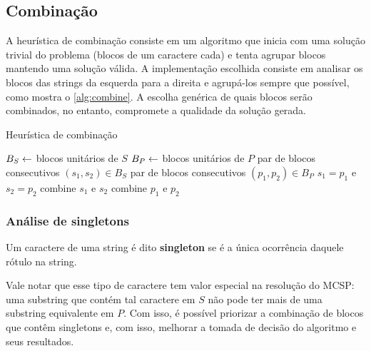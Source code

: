 
\subsection{Combinação}

    A heurística de combinação consiste em um algoritmo que inicia com uma solução trivial do problema (blocos de um caractere cada) e tenta agrupar blocos mantendo uma solução válida. A implementação escolhida consiste em analisar os blocos das strings da esquerda para a direita e agrupá-los sempre que possível, como mostra o \cref{alg:combine}. A escolha genérica de quais blocos serão combinados, no entanto, compromete a qualidade da solução gerada.


    \begin{algorithm}
        \caption{Heurística de combinação} \label{alg:combine}
        \begin{codebox}
        \li $B_S \leftarrow$ blocos unitários de $S$
        \li $B_P \leftarrow$ blocos unitários de $P$
        \li \Para \Cada par de blocos consecutivos $(s_1, s_2) \in B_S$ \Faca
            \Do
        \li     \Para \Cada par de blocos consecutivos $(p_1, p_2) \in B_P$ \Faca
                \Do
        \li         \Se $s_1 = p_1$ e $s_2 = p_2$ \Entao
                    \Do 
        \li             combine $s_1$ e $s_2$
        \li             combine $p_1$ e $p_2$
                    \End
                \End
            \End
        \end{codebox}
    \end{algorithm}

    \subsubsection{Análise de singletons}
    
        \begin{definition}
            Um caractere de uma string é dito \textbf{singleton} se é a única ocorrência daquele rótulo na string.
        \end{definition}

        Vale notar que esse tipo de caractere tem valor especial na resolução do MCSP: uma substring que contém tal caractere em $S$ não pode ter mais de uma substring equivalente em $P$. Com isso, é possível priorizar a combinação de blocos que contêm singletons e, com isso, melhorar a tomada de decisão do algoritmo e seus resultados.

